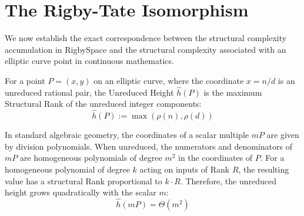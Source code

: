 \documentclass[11pt, letterpaper]{article}
\newcommand{\rank}{\rho}
\begin{document}
\section{The Rigby-Tate Isomorphism}

We now establish the exact correspondence between the structural complexity accumulation in RigbySpace and the structural complexity associated with an elliptic curve point in continuous mathematics.

\begin{definition}\label{def:height}
\begin{rsbox}
For a point $P=(x,y)$ on an elliptic curve, where the coordinate $x=n/d$ is an unreduced rational pair, the Unreduced Height $\hat{h}(P)$ is the maximum Structural Rank of the unreduced integer components:
\[ \hat{h}(P) := \max(\rank(n), \rank(d)) \]
\end{rsbox}
\end{definition}

\begin{lemma}\label{lem:quad_growth}
\begin{verifybox}
In standard algebraic geometry, the coordinates of a scalar multiple $mP$ are given by division polynomials. When unreduced, the numerators and denominators of $mP$ are homogeneous polynomials of degree $m^2$ in the coordinates of $P$.
For a homogeneous polynomial of degree $k$ acting on inputs of Rank $R$, the resulting value has a structural Rank proportional to $k \cdot R$.
Therefore, the unreduced height grows quadratically with the scalar $m$:
\[ \hat{h}(mP) = \Theta(m^2) \]
\end{verifybox}
\end{lemma}
\end{document}
